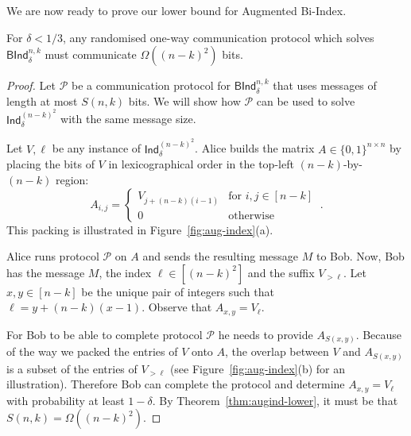 %



%

We are now ready to prove our lower bound for \textsf{Augmented Bi-Index}.
\begin{theorem}\label{thm:bind-lower}
    For $\delta < 1/3$, any randomised one-way communication protocol which solves $\textsf{BInd}^{n,k}_\delta$ must communicate $\Omega((n-k)^2)$ bits.
\end{theorem}
\begin{proof}
    Let $\mathcal{P}$ be a communication protocol for $\textsf{BInd}^{n,k}_\delta$ that uses messages of length at most 
    $S(n, k)$ bits. We will show how $\mathcal{P}$ can be used to solve $\textsf{Ind}^{(n-k)^2}_\delta$ with the same message size.
    
    Let $V, \ell$ be any instance of $\textsf{Ind}^{(n-k)^2}_\delta$. Alice builds the matrix $A \in \{ 0, 1 \}^{n \times n}$ by placing the bits of $V$ in lexicographical order in the top-left $(n-k)$-by-$(n-k)$ region:
    \[
        A_{i,j} =   \begin{cases}
                        V_{j+(n-k)(i-1)} &\text{for } i,j \in [n-k]\\
                        0 &\text{otherwise}
                    \end{cases} \ .
    \]    
    This packing is illustrated in Figure~\ref{fig:aug-index}(a).
    
    Alice runs protocol $\mathcal{P}$ on $A$ and sends the resulting message $M$ to Bob.    
    Now, Bob has the message $M$, the index $\ell \in [(n-k)^2]$ and the suffix $V_{>\ell}$. Let $x, y \in [n-k]$ be the unique pair of integers such that $\ell = y + (n-k)(x-1)$. Observe that $A_{x,y} = V_\ell$.
    
    For Bob to be able to complete protocol $\mathcal{P}$ he needs to provide $A_{S(x,y)}$. Because of the way we packed the entries of $V$ onto $A$, the overlap between $V$ and $A_{S(x,y)}$ is a subset of the entries of $V_{>\ell}$ (see Figure~\ref{fig:aug-index}(b) for an illustration). Therefore Bob can complete the protocol and determine $A_{x,y} = V_\ell$ with probability at least $1-\delta$.    
    By Theorem~\ref{thm:augind-lower}, it must be that $S(n, k) = \Omega((n-k)^2)$.
\end{proof}


